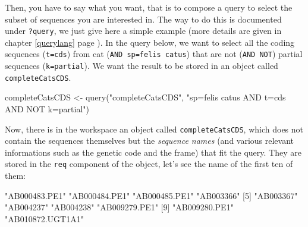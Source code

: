 \documentclass{article}
\begin{document}
Then, you have to say what you want, that is to compose a query
to select the subset of sequences you are interested in. The way to do this is
documented under \texttt{?query}, we just give here a simple example
(more details are given in chapter \ref{querylang} page \pageref{querylang}). 
In the query below, we want to select all the coding sequences 
(\texttt{t=cds}) from cat (\texttt{AND sp=felis catus}) that are not 
(\texttt{AND NOT}) partial sequences (\texttt{k=partial}). 
We want the result to be stored in an object called \texttt{completeCatsCDS}.


\begin{Schunk}
\begin{Sinput}
 completeCatsCDS <- query("completeCatsCDS", "sp=felis catus AND t=cds AND NOT k=partial")
\end{Sinput}
\end{Schunk}

Now, there is in the workspace an object called \texttt{completeCatsCDS}, which
does not contain the sequences themselves but the \emph{sequence names} (and various relevant informations
such as the genetic code and the frame) that fit 
the query. They are stored in the \texttt{req} component of the object,
let's see the name of the first ten of them:

\begin{Schunk}
\begin{Soutput}
 [1] "AB000483.PE1"    "AB000484.PE1"    "AB000485.PE1"    "AB003366"       
 [5] "AB003367"        "AB004237"        "AB004238"        "AB009279.PE1"   
 [9] "AB009280.PE1"    "AB010872.UGT1A1"
\end{Soutput}
\end{Schunk}
\end{document}

